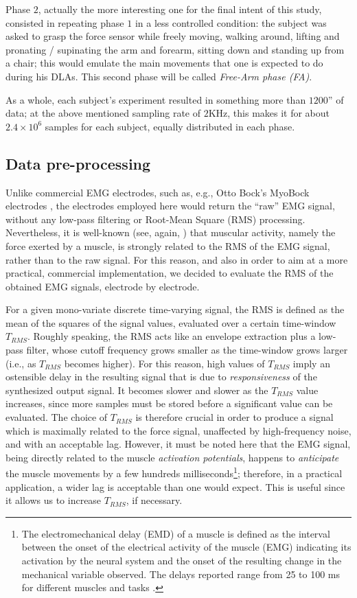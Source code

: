\documentclass[10pt]{bmc_article}
\newenvironment{bmcformat}{\begin{raggedright}\baselineskip20pt\sloppy\setboolean{publ}{false}}{\end{raggedright}\baselineskip20pt\sloppy}
\begin{document}
\begin{bmcformat}
Phase $2$, actually the more interesting one for the final intent of
this study, consisted in repeating phase $1$ in a less controlled
condition: the subject was asked to grasp the force sensor while
freely moving, walking around, lifting and pronating / supinating the
arm and forearm, sitting down and standing up from a chair; this would
emulate the main movements that one is expected to do during his DLAs.
This second phase will be called \emph{Free-Arm phase (FA)}.

As a whole, each subject's experiment resulted in something more than
$1200$'' of data; at the above mentioned sampling rate of $2$KHz, this
makes it for about $2.4\times 10^6$ samples for each subject, equally
distributed in each phase.

\subsection*{Data pre-processing}

Unlike commercial EMG electrodes, such as, e.g., Otto Bock's MyoBock
electrodes \cite{ottobock}, the electrodes employed here would return
the ``raw'' EMG signal, without any low-pass filtering or Root-Mean
Square (RMS) processing. Nevertheless, it is well-known (see, again,
\cite{deluca,zecca}) that muscular activity, namely the force exerted
by a muscle, is strongly related to the RMS of the EMG signal, rather
than to the raw signal. For this reason, and also in order to aim at a
more practical, commercial implementation, we decided to evaluate the
RMS of the obtained EMG signals, electrode by electrode.

For a given mono-variate discrete time-varying signal, the RMS is
defined as the mean of the squares of the signal values, evaluated
over a certain time-window $T_{RMS}$. Roughly speaking, the RMS acts
like an envelope extraction plus a low-pass filter, whose cutoff
frequency grows smaller as the time-window grows larger (i.e., as
$T_{RMS}$ becomes higher). For this reason, high values of $T_{RMS}$
imply an ostensible delay in the resulting signal that is due to
\emph{responsiveness} of the synthesized output signal. It becomes
slower and slower as the $T_{RMS}$ value increases, since more samples
must be stored before a significant value can be evaluated.  The
choice of $T_{RMS}$ is therefore crucial in order to produce a signal
which is maximally related to the force signal, unaffected by
high-frequency noise, and with an acceptable lag. However, it must be
noted here that the EMG signal, being directly related to the muscle
\emph{activation potentials}, happens to \emph{anticipate} the muscle
movements by a few hundreds milliseconds\footnote{The
electromechanical delay (EMD) of a muscle is defined as the interval
between the onset of the electrical activity of the muscle (EMG)
indicating its activation by the neural system and the onset of the
resulting change in the mechanical variable observed. The delays
reported range from 25 to 100 ms for different muscles and tasks
\cite{Wolf1994}.}; therefore, in a practical application, a wider lag
is acceptable than one would expect. This is useful since it allows us
to increase $T_{RMS}$, if necessary.


\end{bmcformat}
\end{document}
